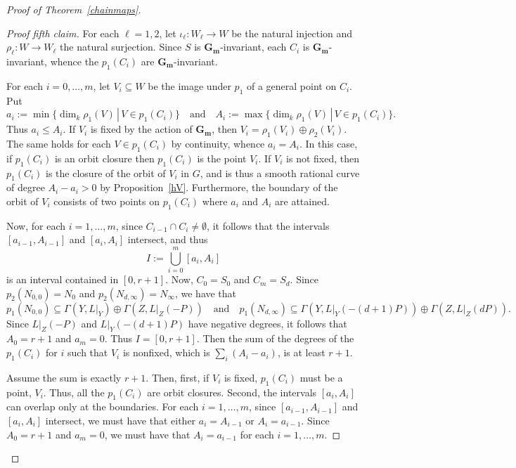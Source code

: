 \documentclass[a4paper,11pt]{amsart}
\theoremstyle{plain}
\theoremstyle{definition}
\theoremstyle{remark}
\def\cc{{\mathbf G}_{\mathbf m}}
\def\:{\colon}
\begin{document}
\begin{proof}[Proof of Theorem~\ref{chainmaps}]
\begin{proof}[Proof fifth claim] For each $\ell=1,2$, let $\iota_\ell\:W_\ell\to W$ be the natural injection and $\rho_\ell\:W\to W_\ell$ the natural surjection. Since $S$ is $\cc$-invariant, each $C_i$ is $\cc$-invariant, whence the $p_1(C_i)$ are $\cc$-invariant. 

For each $i=0,\dots,m$, let $V_i\subseteq W$ be the image under $p_1$ of a general point on $C_i$. Put 
\[
a_i:=\min\{\dim_k\rho_1(V)\,|\,V\in p_1(C_i)\}
\quad\text{and}\quad 
A_i:=\max\{\dim_k\rho_1(V)\,|\,V\in p_1(C_i)\}.
\]
Thus $a_i\leq A_i$. If $V_i$ is fixed by the action of $\cc$, then $V_i=\rho_1(V_i)\oplus\rho_2(V_i)$. The same holds for each $V\in p_1(C_i)$ by continuity, whence $a_i=A_i$. In this case, if $p_1(C_i)$ is an orbit closure then $p_1(C_i)$ is the point $V_i$. If $V_i$ is not fixed, then $p_1(C_i)$ is the closure of the orbit of $V_i$ in $G$, and is thus a smooth rational curve of degree $A_i-a_i>0$ by Proposition~\ref{hV}. Furthermore, the boundary of the orbit of $V_i$ consists of two points on $p_1(C_i)$ where $a_i$ and $A_i$ are attained. 

Now, for each $i=1,\dots,m$, since $C_{i-1}\cap C_i\neq\emptyset$, it follows that  
the intervals $[a_{i-1},A_{i-1}]$ and $[a_i,A_i]$ intersect, and thus 
\[
I:=\bigcup_{i=0}^m[a_i,A_i]
\]
is an interval contained in $[0,r+1]$.
Now, $C_0=S_0$ and $C_m=S_d$. Since $p_2(N_{0,0})=N_0$ and $p_2(N_{d,\infty})=N_\infty$, we have that
\[
p_1(N_{0,0})\subseteq\Gamma(Y,L|_Y)\oplus\Gamma(Z,L|_Z(-P))\quad
\text{and}\quad 
p_1(N_{d,\infty})\subseteq\Gamma(Y,L|_Y(-(d+1)P))\oplus\Gamma(Z,L|_Z(dP)).
\]
Since $L|_Z(-P)$ and $L|_Y(-(d+1)P)$ have negative degrees, it follows that $A_0=r+1$ and $a_m=0$. 
Thus $I=[0,r+1]$. Then the sum of the degrees of the $p_1(C_i)$ for $i$ such that $V_i$ is nonfixed, which is $\sum_i(A_i-a_i)$, is at least $r+1$.

Assume the sum is exactly $r+1$. Then, first, if $V_i$ is fixed, $p_1(C_i)$ must be a point, $V_i$. Thus, all the $p_1(C_i)$ are orbit closures. Second, the intervals $[a_i,A_i]$ can overlap only at the boundaries. For each $i=1,\dots,m$, since $[a_{i-1},A_{i-1}]$ and $[a_i,A_i]$ intersect, we must have that either 
$a_i=A_{i-1}$ or $A_i=a_{i-1}$. Since $A_0=r+1$ and $a_m=0$, we must have that $A_i=a_{i-1}$ for each $i=1,\dots,m$. 


\end{proof}
\end{proof}
\end{document}
